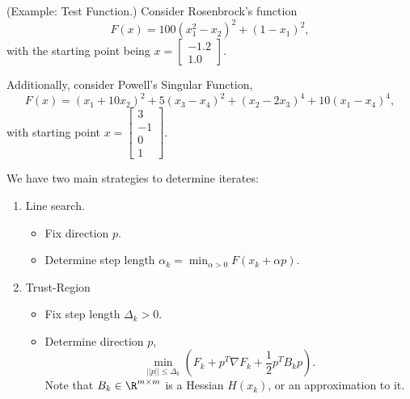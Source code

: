\documentclass[letterpaper]{article}
\begin{document}
\begin{mdframed}
    (Example: Test Function.) Consider Rosenbrock's function \[F(x) = 100 (x_1^2 - x_2)^2 + (1 - x_1)^2,\] with the starting point being $x = \begin{bmatrix}
        -1.2 \\ 1.0
    \end{bmatrix}$. 
    
    \bigskip 

    Additionally, consider Powell's Singular Function, 
    \[F(x) = (x_1 + 10x_2)^2 + 5(x_3 - x_4)^2 + (x_2 - 2x_3)^4 + 10(x_1 - x_4)^4,\] 
    with starting point $x = \begin{bmatrix}
        3 \\ -1 \\ 0 \\ 1
    \end{bmatrix}.$
\end{mdframed}
We have two main strategies to determine iterates: 
\begin{enumerate}
    \item Line search. 
    \begin{itemize}
        \item Fix direction $p$. 
        \item Determine step length $\alpha_k = \min_{\alpha > 0} F(x_k + \alpha p)$.
    \end{itemize}

    \item Trust-Region  
    \begin{itemize}
        \item Fix step length $\Delta_k > 0$.
        \item Determine direction $p$, \[\min_{||p|| \leq \Delta_k} \left(F_{k} + p^T \nabla F_k +  \frac{1}{2}p^T B_k p\right).\] 
        Note that $B_k \in \R^{m \times m}$ is a Hessian $H(x_k)$, or an approximation to it.
    \end{itemize}
\end{enumerate}
\end{document}
